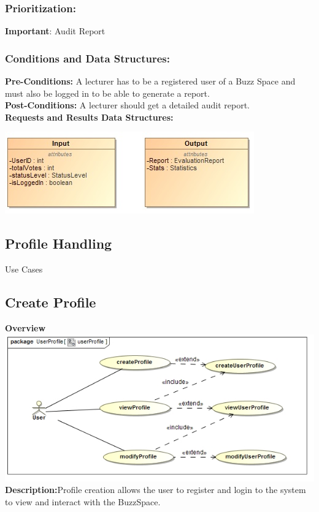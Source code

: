 \documentclass[a4paper,11pt]{article}
\begin{document}
\subsubsection{Prioritization:} 
\textbf{Important}: Audit Report
\subsubsection{Conditions and Data Structures:}
\textbf{Pre-Conditions:}
A lecturer has to be a registered user of a Buzz Space and must also be logged in to be able to generate a report.\\
\textbf{Post-Conditions:}
A lecturer should get a detailed audit report.\\
\textbf{Requests and Results Data Structures:}
\begin{center}
\includegraphics{Images/Report/Input&Output}
\end{center}
\newpage
\begin{center}
\section{\textbf{\huge{Profile Handling}}}
\Large{Use Cases}
\end{center}

\subsection{Create Profile}
\textbf{Overview}\\
\includegraphics[width=1\linewidth]{./Images/OverviewDiagrams/ProfileHandling.jpg}\\
\textbf{Description:}Profile creation allows the user to register and login to the system to view and interact with the BuzzSpace.
\end{document}
